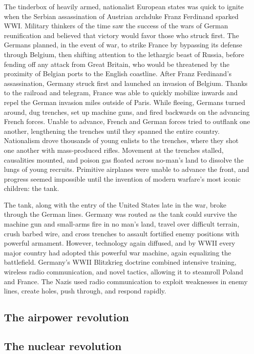 \documentclass[nobib]{tufte-handout}
\begin{document}
The tinderbox of heavily armed, nationalist European states 
was quick to ignite when the Serbian assassination of Austrian archduke 
Franz Ferdinand sparked WWI. Military thinkers of the time 
saw the success of the wars of German reunification 
and believed that victory would favor those who struck first.
The Germans planned, in the event of war, to strike France 
by bypassing its defense through Belgium, then shifting 
attention to the lethargic beast of Russia, before fending 
off any attack from Great Britain, who would be threatened 
by the proximity of Belgian ports to the English coastline. 
After Franz Ferdinand's assassination, Germany struck first
and launched an invasion of Belgium. Thanks to the railroad 
and telegram, France was able to quickly mobilize inwards and 
repel the German invasion miles outside of Paris. While fleeing, 
Germans turned around, dug trenches, set up machine guns, 
and fired backwards on the advancing French forces. Unable 
to advance, French and German forces tried to outflank 
one another, lengthening the trenches until they spanned the entire country. 
Nationalism drove thousands of young enlists to the trenches, 
where they shot one another with mass-produced rifles. 
Movement at the trenches stalled, causalities mounted, 
and poison gas floated across no-man's land to dissolve the 
lungs of young recruits. Primitive airplanes were unable to 
advance the front, and progress seemed impossible until 
the invention of modern warfare's most iconic children: 
the tank. 

The tank, along with the entry of the United States late 
in the war, broke through the German lines. Germany was routed 
as the tank could survive the machine gun and small-arms 
fire in no man's land, travel over difficult terrain, 
crush barbed wire, and cross trenches to assault 
fortified enemy positions with powerful armament. However, 
technology again diffused, and by WWII every major country had 
adopted this powerful war machine, again equalizing the 
battlefield. Germany's WWII Blitzkrieg doctrine combined intensive training,
wireless radio communication, and novel tactics, allowing it 
to steamroll Poland and France. The Nazis used radio communication to 
exploit weaknesses in enemy lines, create holes, push through, 
and respond rapidly. 

\subsection{The airpower revolution}
\subsection{The nuclear revolution}
\end{document}
